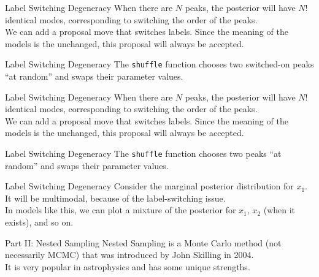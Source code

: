 \begin{frame}[t]{Label Switching Degeneracy}
When there are $N$ peaks, the posterior will have $N!$ identical modes,
corresponding to switching the order of the peaks.\\

\vspace{20pt}
We can add a proposal move that switches labels. Since the meaning of the
models is the unchanged, this proposal will always be accepted. 
\end{frame}


\begin{frame}[t]{Label Switching Degeneracy}
The {\tt shuffle} function chooses two switched-on peaks ``at random''
and swaps their parameter values.
\end{frame}

\begin{frame}[t]{Label Switching Degeneracy}
When there are $N$ peaks, the posterior will have $N!$ identical modes,
corresponding to switching the order of the peaks.\\

\vspace{20pt}
We can add a proposal move that switches labels. Since the meaning of the
models is the unchanged, this proposal will always be accepted. 
\end{frame}


\begin{frame}[t]{Label Switching Degeneracy}
The {\tt shuffle} function chooses two peaks ``at random''
and swaps their parameter values.
\end{frame}



\begin{frame}[t]{Label Switching Degeneracy}
Consider the marginal posterior distribution for $x_1$. It will be multimodal,
because of the label-switching issue.\\

\vspace{20pt}
In models like this, we can plot a mixture of the posterior for $x_1$, $x_2$
(when it exists), and so on.
\end{frame}





\begin{frame}[t]{Part II: Nested Sampling}
Nested Sampling is a Monte Carlo method (not necessarily MCMC) that was
introduced by John Skilling in 2004.\\
\vspace{20pt}
It is very popular in astrophysics and has some unique strengths.
\end{frame}


